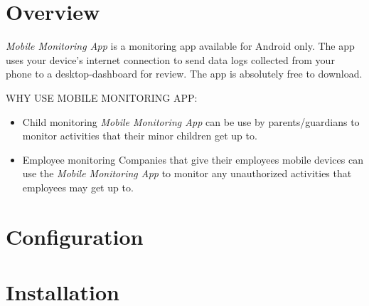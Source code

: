 \documentclass[hidelinks, 12pt, oneside]{article}
\begin{document}
	
	\tableofcontents
	\newpage
	
	\section{Overview}
	\emph{Mobile Monitoring App} is a monitoring app available for Android only. The app
	 uses your device's internet connection to send data logs collected from your phone to a desktop-dashboard
	 for review. The app is absolutely free to download.\newline\newline
	 
	 \uppercase{Why use Mobile Monitoring App:}\newline
	 \begin{itemize}
		\item Child monitoring\newline
		\emph{Mobile Monitoring App} can be use by parents/guardians to monitor activities that their minor
		 children get up to.	
		\item Employee monitoring\newline
		Companies that give their employees mobile devices can use the \emph{Mobile Monitoring App} to monitor any 
		unauthorized activities that employees may get up to.
	\end{itemize}
	\newpage
	
	
	\section{Configuration}\newpage
	
	\section{Installation}\newpage
	
\end{document}
